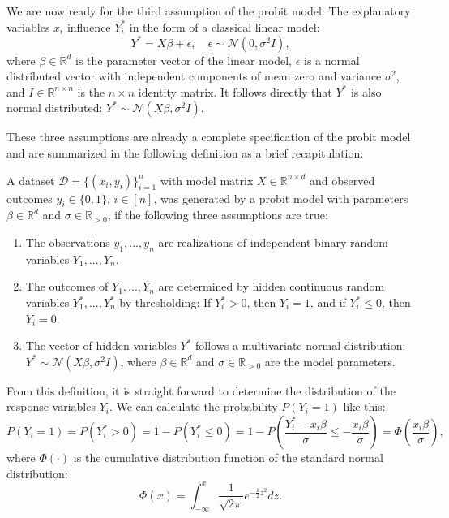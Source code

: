 We are now ready for the third assumption of the probit model:
The explanatory variables
$x_i$ influence $Y_i^\ast$ in the form of a classical linear model:
\begin{equation}
    Y^\ast = X \beta + \epsilon, \quad \epsilon \sim \mathcal{N}(0, \sigma^2 I),
\end{equation}
where $\beta \in \mathbb{R}^d$ is the parameter vector of the linear model,
$\epsilon$ is a normal distributed vector with independent components of
mean zero and variance $\sigma^2$,
and
$I \in \mathbb{R}^{n \times n}$ is the $n \times n$ identity matrix.
It follows directly that $Y^\ast$ is also normal distributed:
$Y^\ast \sim \mathcal{N}(X \beta, \sigma^2 I)$.

These three assumptions are already a complete specification of the
probit model and are summarized in the following definition as a
brief recapitulation:

\begin{definition}
    A dataset $\mathcal{D} = \{(x_i, y_i)\}_{i=1}^n$ with model matrix
    $X \in \mathbb{R}^{n \times d}$ and observed outcomes
    $y_i \in \{0, 1\}$, $i \in [n]$, was generated by a probit model with
    parameters $\beta \in \mathbb{R}^d$ and $\sigma \in \mathbb{R}_{>0}$, if
    the following three assumptions are true:
    \begin{enumerate}
        \item The observations $y_1, ..., y_n$ are realizations of independent
              binary random variables $Y_1, ..., Y_n$.
        \item The outcomes of $Y_1, ..., Y_n$ are determined by hidden
              continuous random variables $Y_1^\ast, ..., Y_n^\ast$ by
              thresholding: If $Y_i^\ast > 0$, then $Y_i = 1$, and if
              $Y_i^\ast \leq 0$, then $Y_i = 0$.
        \item The vector of hidden variables $Y^\ast$ follows a multivariate
              normal distribution:
              $Y^\ast \sim \mathcal{N}(X \beta, \sigma^2 I)$,
              where $\beta \in \mathbb{R}^d$ and $\sigma \in \mathbb{R}_{>0}$
              are the model parameters.
    \end{enumerate}
\end{definition}

From this definition, it is straight forward to determine the
distribution of the response variables $Y_i$.
We can calculate the probability $P(Y_i = 1)$ like this:
\begin{equation*}
    P(Y_i = 1) = P(Y_i^\ast > 0) = 1 - P(Y_i^\ast \leq 0)
    = 1 - P\left(\frac{Y_i^\ast - x_i \beta}{\sigma} \leq -\frac{x_i \beta}{\sigma} \right)
    = \Phi\left(\frac{x_i \beta}{\sigma} \right),
\end{equation*}
where $\Phi(\cdot)$ is the cumulative distribution function of the standard normal
distribution:
\begin{equation*}
    \Phi(x) = \int_{-\infty}^x \frac{1}{\sqrt{2 \pi}} e^{- \frac{1}{2} z^2} dz.
\end{equation*}

